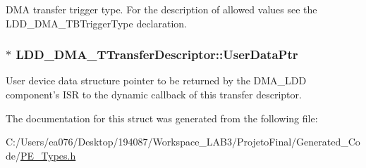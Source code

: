 D\-M\-A transfer trigger type. For the description of allowed values see the L\-D\-D\-\_\-\-D\-M\-A\-\_\-\-T\-B\-Trigger\-Type declaration. \hypertarget{struct_l_d_d___d_m_a___t_transfer_descriptor_a4136d6742944c7b04a94695c78b581b8}{
\subsubsection[{User\-Data\-Ptr}]{$\ast$ L\-D\-D\-\_\-\-D\-M\-A\-\_\-\-T\-Transfer\-Descriptor\-::\-User\-Data\-Ptr}}\label{struct_l_d_d___d_m_a___t_transfer_descriptor_a4136d6742944c7b04a94695c78b581b8}
User device data structure pointer to be returned by the D\-M\-A\-\_\-\-L\-D\-D component's I\-S\-R to the dynamic callback of this transfer descriptor. 

The documentation for this struct was generated from the following file\-:\begin{DoxyCompactItemize}
\item 
C\-:/\-Users/ea076/\-Desktop/194087/\-Workspace\-\_\-\-L\-A\-B3/\-Projeto\-Final/\-Generated\-\_\-\-Code/\hyperlink{_p_e___types_8h}{P\-E\-\_\-\-Types.\-h}\end{DoxyCompactItemize}
